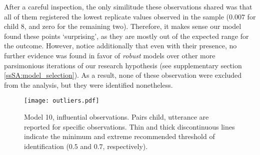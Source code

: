 After a careful inspection, the only similitude these observations shared was that all of them registered the lowest replicate values observed in the sample ($0.007$ for child 8, and zero for the remaining two). Therefore, it makes sense our model found these points `surprising', as they are mostly out of the expected range for the outcome. However, notice additionally that even with their presence, no further evidence was found in favor of \textit{robust} models over other more parsimonious iterations of our research hypothesis (see supplementary section \ref{ssSA:model_selection}). As a result, none of these observation were excluded from the analysis, but they were identified nonetheless.
%
\begin{figure}[!h]
	\centering
	\texttt{[image: outliers.pdf]}
	\caption[Model 10, influential observations]{Model 10, influential observations. Pairs child, utterance are reported for specific observations. Thin and thick discontinuous lines indicate the minimum and extreme recommended threshold of identification ($0.5$ and $0.7$, respectively).}
	\label{fig:outliers}
\end{figure}
%
%